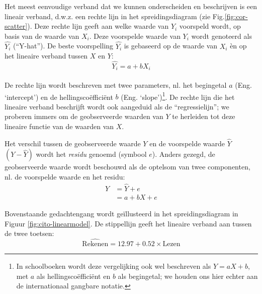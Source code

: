 \documentclass[
]{book}
\begin{document}
Het meest eenvoudige verband dat we kunnen onderscheiden en beschrijven
is een lineair verband, d.w.z. een rechte lijn in het spreidingsdiagram
(zie Fig.\ref{fig:cor-scatter}). Deze rechte lijn geeft aan welke waarde
van \(Y_i\) voorspeld wordt, op basis van de waarde van \(X_i\). Deze
voorspelde waarde van \(Y_i\) wordt genoteerd als \(\widehat{Y_i}\)
(``Y-hat''). De beste voorspelling \(\widehat{Y_i}\) is gebaseerd op de
waarde van \(X_i\) èn op het lineaire verband tussen \(X\) en \(Y\):
\begin{equation}
    \widehat{Y_i} = a + b {X_i} 
  \label{eq:linearmodel2}
\end{equation}\\
De rechte lijn wordt beschreven met
twee parameters, nl. het begingetal \(a\) (Eng. `intercept') en de
hellingscoëfficiënt \(b\) (Eng. `slope')\footnote{In schoolboeken wordt deze vergelijking ook wel beschreven als \(Y = a X + b\), met \(a\) als hellingscoëfficiënt en \(b\) als begingetal; we houden ons hier echter aan de internationaal gangbare notatie.}. De rechte lijn die het
lineaire verband beschrijft wordt ook aangeduid als de ``regressielijn'';
we proberen immers om de geobserveerde waarden van \(Y\) te herleiden tot
deze lineaire functie van de waarden van \(X\).

Het verschil tussen de geobserveerde waarde \(Y\) en de voorspelde waarde
\(\widehat{Y}\) \((Y-\widehat{Y})\) wordt het \emph{residu} genoemd (symbool
\(e\)). Anders gezegd, de geobserveerde waarde wordt beschouwd als de
optelsom van twee componenten, nl. de voorspelde waarde en het residu:
\begin{align}
    Y   &= \widehat{Y} + e \\
        &= a + b X + e 
  \label{eq:linearmodel3}
\end{align}

Bovenstaande gedachtengang wordt geïllusteerd in het spreidingsdiagram
in Figuur \ref{fig:cito-linearmodel}. De stippellijn geeft het lineaire
verband aan tussen de twee toetsen:
\begin{equation}
    \widehat{\textrm{Rekenen}} = 12.97 + 0.52 \times \textrm{Lezen}
  \label{eq:cito-linearmodel}
\end{equation}
\end{document}
